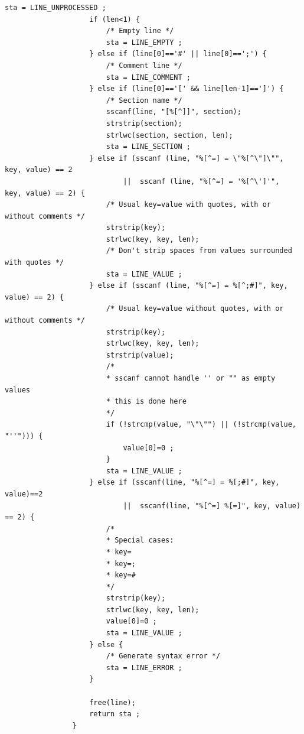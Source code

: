 \documentclass{article}
\begin{document}
\begin{Verbatim}[gobble=8]
                    sta = LINE_UNPROCESSED ;
                    if (len<1) {
                        /* Empty line */
                        sta = LINE_EMPTY ;
                    } else if (line[0]=='#' || line[0]==';') {
                        /* Comment line */
                        sta = LINE_COMMENT ;
                    } else if (line[0]=='[' && line[len-1]==']') {
                        /* Section name */
                        sscanf(line, "[%[^]]", section);
                        strstrip(section);
                        strlwc(section, section, len);
                        sta = LINE_SECTION ;
                    } else if (sscanf (line, "%[^=] = \"%[^\"]\"", key, value) == 2
                            ||  sscanf (line, "%[^=] = '%[^\']'",   key, value) == 2) {
                        /* Usual key=value with quotes, with or without comments */
                        strstrip(key);
                        strlwc(key, key, len);
                        /* Don't strip spaces from values surrounded with quotes */
                        sta = LINE_VALUE ;
                    } else if (sscanf (line, "%[^=] = %[^;#]", key, value) == 2) {
                        /* Usual key=value without quotes, with or without comments */
                        strstrip(key);
                        strlwc(key, key, len);
                        strstrip(value);
                        /*
                        * sscanf cannot handle '' or "" as empty values
                        * this is done here
                        */
                        if (!strcmp(value, "\"\"") || (!strcmp(value, "''"))) {
                            value[0]=0 ;
                        }
                        sta = LINE_VALUE ;
                    } else if (sscanf(line, "%[^=] = %[;#]", key, value)==2
                            ||  sscanf(line, "%[^=] %[=]", key, value) == 2) {
                        /*
                        * Special cases:
                        * key=
                        * key=;
                        * key=#
                        */
                        strstrip(key);
                        strlwc(key, key, len);
                        value[0]=0 ;
                        sta = LINE_VALUE ;
                    } else {
                        /* Generate syntax error */
                        sta = LINE_ERROR ;
                    }
                
                    free(line);
                    return sta ;
                }
                

\end{Verbatim}
\end{document}
